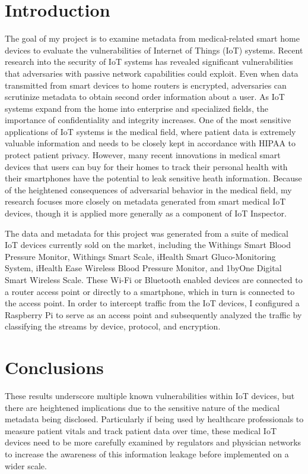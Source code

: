 \section{Introduction}

The goal of my project is to examine metadata from medical-related smart home devices to evaluate the vulnerabilities of Internet of Things (IoT) systems. Recent research into the security of IoT systems has revealed significant vulnerabilities that adversaries with passive network capabilities could exploit. Even when data transmitted from smart devices to home routers is encrypted, adversaries can scrutinize metadata to obtain second order information about a user. As IoT systems expand from the home into enterprise and specialized fields, the importance of confidentiality and integrity increases. One of the most sensitive applications of IoT systems is the medical field, where patient data is extremely valuable information and needs to be closely kept in accordance with HIPAA to protect patient privacy. However, many recent innovations in medical smart devices that users can buy for their homes to track their personal health with their smartphones have the potential to leak sensitive heath information. Because of the heightened consequences of adversarial behavior in the medical field, my research focuses more closely on metadata generated from smart medical IoT devices, though it is applied more generally as a component of IoT Inspector.  

The data and metadata for this project was generated from a suite of medical IoT devices currently sold on the market, including the Withings Smart Blood Pressure Monitor, Withings Smart Scale, iHealth Smart Gluco-Monitoring System, iHealth Ease Wireless Blood Pressure Monitor, and 1byOne Digital Smart Wireless Scale. These Wi-Fi or Bluetooth enabled devices are connected to a router access point or directly to a smartphone, which in turn is connected to the access point. In order to intercept traffic from the IoT devices, I configured a Raspberry Pi to serve as an access point and subsequently analyzed the traffic by classifying the streams by device, protocol, and encryption. 



\section{Conclusions}

These results underscore multiple known vulnerabilities within IoT devices, but there are heightened implications due to the sensitive nature of the medical metadata being disclosed. Particularly if being used by healthcare professionals to measure patient vitals and track patient data over time, these medical IoT devices need to be more carefully examined by regulators and physician networks to increase the awareness of this information leakage before implemented on a wider scale. 

